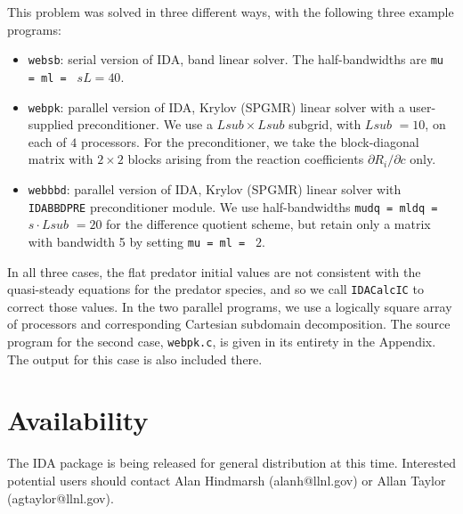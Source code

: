 \documentclass[11pt]{article}
\begin{document}
This problem was solved in three different ways, with the following
three example programs:
\begin{itemize}

\item {\tt websb}: serial version of IDA, band linear solver.  The
half-bandwidths are 
\newline
{\tt mu = ml = } $sL = 40$.

\item {\tt webpk}: parallel version of IDA, Krylov (SPGMR) linear
solver with a user-supplied preconditioner. We use a $\mathit{Lsub} \times 
\mathit{Lsub}$ subgrid, with $\mathit{Lsub}$ $ = 10$, on each of $4$ processors. 
For the preconditioner, we take the block-diagonal matrix with $2 \times 2$ 
blocks arising from the reaction coefficients $\partial R_i/\partial c$ only.

\item {\tt webbbd}: parallel version of IDA, Krylov (SPGMR) linear
solver with {\tt IDABBDPRE} preconditioner module.  We use 
half-bandwidths {\tt mudq = mldq =} $\mathit{s}\cdot \mathit{Lsub}$ $ = 20$ 
for the difference quotient scheme, but retain only a matrix with 
bandwidth 5 by setting {\tt mu = ml = } $2$.

\end{itemize}
In all three cases, the flat predator initial values are not consistent 
with the quasi-steady equations for the predator species, and so we call 
{\tt IDACalcIC} to correct those values.  In the two parallel
programs, we use a logically square array of processors and
corresponding Cartesian subdomain decomposition.
The source program for the second case, {\tt webpk.c}, is given in its
entirety in the Appendix. The output for this case is also included
there.


\section{Availability}

The IDA package is being released for general distribution at this
time.  Interested potential users should contact Alan Hindmarsh
(alanh@llnl.gov) or Allan Taylor (agtaylor@llnl.gov).
\end{document}
